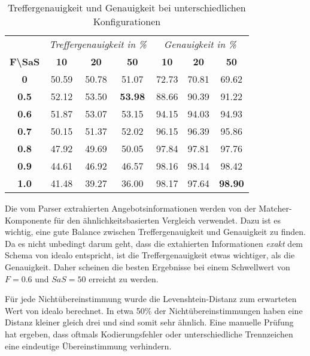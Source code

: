 \begin{table}[h]
    \centering
    \begin{tabular}{ c | c c c | c c c }
        &   \multicolumn{3}{c}{\textit{Treffergenauigkeit in \%}}    &   \multicolumn{3}{c}{\textit{Genauigkeit in \%}} \\
        \textbf{F\textbackslash SaS} & \textbf{10} & \textbf{20} & \textbf{50} & \textbf{10} & \textbf{20} & \textbf{50}  \\
        \hline
        \textbf{0}       &   50.59 &   50.78 &   51.07         &   72.73 &   70.81 &   69.62 \\
        \textbf{0.5}     &   52.12 &   53.50 &   \textbf{53.98}&   88.66 &   90.39 &   91.22 \\
        \textbf{0.6}     &   51.87 &   53.07 &   53.15         &   94.15 &   94.03 &   94.93 \\
        \textbf{0.7}     &   50.15 &   51.37 &   52.02         &   96.15 &   96.39 &   95.86 \\
        \textbf{0.8}     &   47.92 &   49.69 &   50.05         &   97.84 &   97.81 &   97.76 \\
        \textbf{0.9}     &   44.61 &   46.92 &   46.57         &   98.16 &   98.14 &   98.42 \\
        \textbf{1.0}     &   41.48 &   39.27 &   36.00         &   98.17 &   97.64 &   \textbf{98.90}

    \end{tabular}
    \caption{Treffergenauigkeit und Genauigkeit bei unterschiedlichen Konfigurationen}
    \label{tab:accuracy-precision}
\end{table}

Die vom Parser extrahierten Angebotsinformationen werden von der Matcher-Komponente für den ähnlichkeitsbasierten
Vergleich verwendet.
Dazu ist es wichtig, eine gute Balance zwischen Treffergenauigkeit und Genauigkeit zu finden.
Da es nicht unbedingt darum geht, dass die extahierten Informationen \textit{exakt} dem Schema von idealo entspricht,
ist die Treffergenauigkeit etwas wichtiger, als die Genauigkeit.
Daher scheinen die besten Ergebnisse bei einem Schwellwert von $F=0.6$ und $SaS=50$ erreicht zu werden.

Für jede Nichtübereinstimmung wurde die Levenshtein-Distanz zum erwarteten Wert von idealo berechnet.
In etwa 50\% der Nichtübereinstimmungen haben eine Distanz kleiner gleich drei und sind somit sehr ähnlich.
Eine manuelle Prüfung hat ergeben, dass oftmals Kodierungsfehler oder unterschiedliche Trennzeichen eine eindeutige
Übereinstimmung verhindern.

